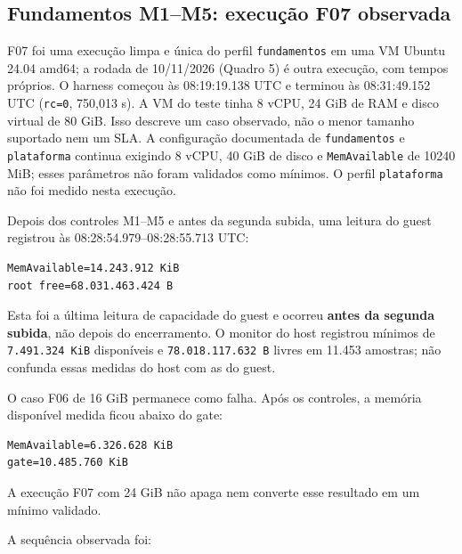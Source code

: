 \documentclass[12pt,openany,oneside,a4paper,chapter=TITLE,english,brazil]{abntex2}
\begin{document}
\begin{apendicesenv}
\section*{Fundamentos M1--M5: execução F07 observada}\label{fundamentos-m1m5-execuuxe7uxe3o-f07-observada}

F07 foi uma execução limpa e única do perfil \texttt{fundamentos} em uma VM Ubuntu
24.04 amd64; a rodada de 10/11/2026 (Quadro 5) é outra execução, com tempos
próprios. O harness começou às 08:19:19.138 UTC e terminou às 08:31:49.152
UTC (\texttt{rc=\allowbreak{}0}, 750,013 s). A VM do teste tinha 8 vCPU, 24 GiB de RAM e disco
virtual de 80 GiB. Isso descreve um caso observado, não o menor tamanho
suportado nem um SLA. A configuração documentada de \texttt{fundamentos} e
\texttt{plataforma} continua exigindo 8 vCPU, 40 GiB de disco e \texttt{Mem\allowbreak{}Available} de
10240 MiB; esses parâmetros não foram validados como mínimos. O perfil \texttt{plataforma}
não foi medido nesta execução.

Depois dos controles M1--M5 e antes da segunda subida, uma leitura do guest
registrou às 08:28:54.979--08:28:55.713 UTC:

\begin{verbatim}
MemAvailable=14.243.912 KiB
root free=68.031.463.424 B
\end{verbatim}

Esta foi a última leitura de capacidade do guest e ocorreu \textbf{antes da segunda
subida}, não depois do encerramento. O monitor do
host registrou mínimos de \texttt{7.\allowbreak{}491.\allowbreak{}324 Ki\allowbreak{}B} disponíveis e \texttt{78.\allowbreak{}018.\allowbreak{}117.\allowbreak{}632 B}
livres em 11.453 amostras; não confunda essas medidas do host com as do guest.

O caso F06 de 16 GiB permanece como falha. Após os controles, a memória
disponível medida ficou abaixo do gate:

\begin{verbatim}
MemAvailable=6.326.628 KiB
gate=10.485.760 KiB
\end{verbatim}

A execução F07 com 24 GiB não apaga nem converte esse resultado em um mínimo
validado.

A sequência observada foi:


\end{apendicesenv}
\end{document}
